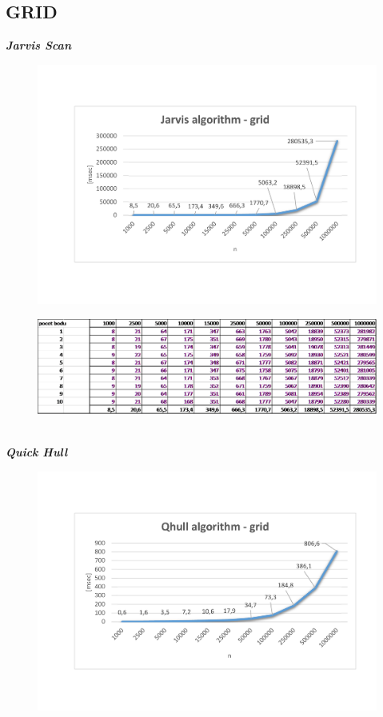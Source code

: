 \documentclass{article}
\begin{document}
\subsection{GRID}
\textit{\textbf {Jarvis Scan}}
\\
\begin{figure}[htbp]
\centering
        \includegraphics[clip, trim=0cm 0cm 0cm 0cm, width=1\textwidth]{jg.pdf}
\end{figure}
\begin{figure}[htbp]
\centering
        \includegraphics[clip, trim=0cm 0cm 0cm 0cm, width=1\textwidth]{jg.png}
\end{figure}
\\
\clearpage
\newpage
\textit{\textbf {Quick Hull}}
\\
\begin{figure}[htbp]
\centering
        \includegraphics[clip, trim=0cm 0cm 0cm 0cm, width=1\textwidth]{qg.pdf}
\end{figure}
\end{document}
